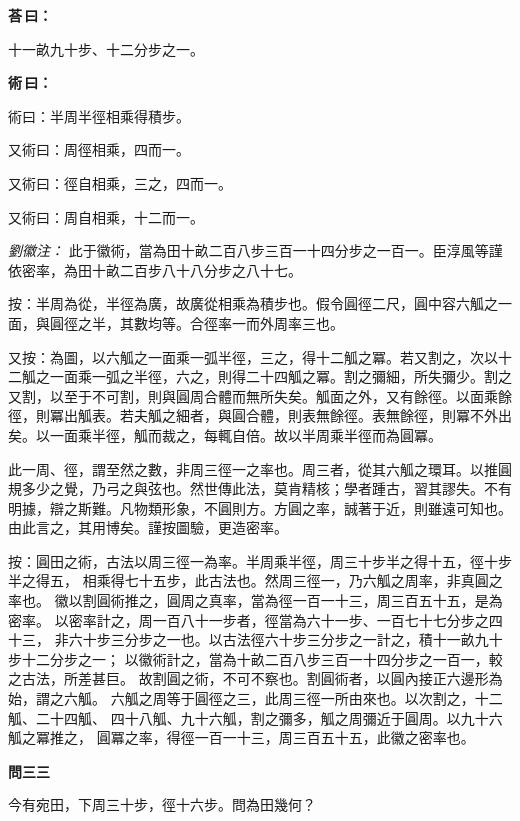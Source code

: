 \documentclass[11pt,a4paper]{article}
\newenvironment{problem}[1][]{%
  \par\vspace{0.6em}\noindent\textcolor{problemcolor}{\textbf{問\ignorespaces#1\unskip}\hspace{0.5em}}%
  \ignorespaces
}{\par\vspace{0.4em}}
\newenvironment{answer}{%
  \par\noindent\textcolor{answercolor}{\textbf{荅\,曰：}}%
  \ignorespaces
}{\par\vspace{0.3em}}
\newenvironment{method}{%
  \par\noindent\textcolor{methodcolor}{\textbf{術\,曰：}}%
  \ignorespaces
}{\par\vspace{0.4em}}
\newenvironment{liuhuicomm}{%
  \par\vspace{0.3em}\noindent\textcolor{commentarycolor}{\small\textit{劉徽注：}}}%
  {\par\vspace{0.5em}}
\begin{document}
\begin{answer}
十一畝九十步、十二分步之一。
\end{answer}

\begin{method}
術曰：半周半徑相乘得積步。

又術曰：周徑相乘，四而一。

又術曰：徑自相乘，三之，四而一。

又術曰：周自相乘，十二而一。
\end{method}

\begin{liuhuicomm}
此于徽術，當為田十畝二百八步三百一十四分步之一百一。臣淳風等謹依密率，為田十畝二百步八十八分步之八十七。

按：半周為從，半徑為廣，故廣從相乘為積步也。假令圓徑二尺，圓中容六觚之一面，與圓徑之半，其數均等。合徑率一而外周率三也。

又按：為圖，以六觚之一面乘一弧半徑，三之，得十二觚之冪。若又割之，次以十二觚之一面乘一弧之半徑，六之，則得二十四觚之冪。割之彌細，所失彌少。割之又割，以至于不可割，則與圓周合體而無所失矣。觚面之外，又有餘徑。以面乘餘徑，則冪出觚表。若夫觚之細者，與圓合體，則表無餘徑。表無餘徑，則冪不外出矣。以一面乘半徑，觚而裁之，每輒自倍。故以半周乘半徑而為圓冪。

此一周、徑，謂至然之數，非周三徑一之率也。周三者，從其六觚之環耳。以推圓規多少之覺，乃弓之與弦也。然世傳此法，莫肯精核；學者踵古，習其謬失。不有明據，辯之斯難。凡物類形象，不圓則方。方圓之率，誠著于近，則雖遠可知也。由此言之，其用博矣。謹按圖驗，更造密率。

按：圓田之術，古法以周三徑一為率。半周乘半徑，周三十步半之得十五，徑十步半之得五，
相乘得七十五步，此古法也。然周三徑一，乃六觚之周率，非真圓之率也。
徽以割圓術推之，圓周之真率，當為徑一百一十三，周三百五十五，是為密率。
以密率計之，周一百八十一步者，徑當為六十一步、一百七十七分步之四十三，
非六十步三分步之一也。以古法徑六十步三分步之一計之，積十一畝九十步十二分步之一；
以徽術計之，當為十畝二百八步三百一十四分步之一百一，較之古法，所差甚巨。
故割圓之術，不可不察也。割圓術者，以圓內接正六邊形為始，謂之六觚。
六觚之周等于圓徑之三，此周三徑一所由來也。以次割之，十二觚、二十四觚、
四十八觚、九十六觚，割之彌多，觚之周彌近于圓周。以九十六觚之冪推之，
圓冪之率，得徑一百一十三，周三百五十五，此徽之密率也。
\end{liuhuicomm}

\begin{problem}[三三]
今有宛田，下周三十步，徑十六步。問為田幾何？
\end{problem}
\end{document}
